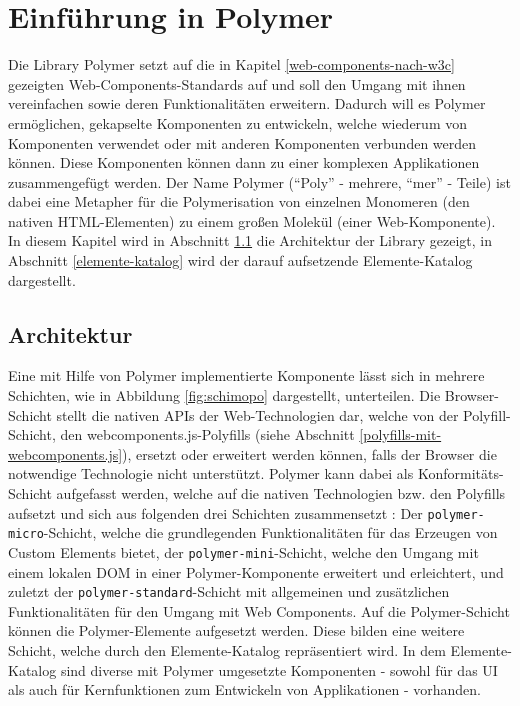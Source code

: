 \chapter{Einführung in Polymer}\label{einfuehrung-in-polymer}

Die Library Polymer setzt auf die in Kapitel \ref{web-components-nach-w3c} gezeigten Web-Components-Standards auf und soll den Umgang mit ihnen vereinfachen sowie deren Funktionalitäten erweitern. Dadurch will es Polymer ermöglichen, gekapselte Komponenten zu entwickeln, welche wiederum von Komponenten verwendet oder mit anderen Komponenten verbunden werden können. Diese Komponenten können dann zu einer komplexen Applikationen zusammengefügt werden. Der Name Polymer (``Poly'' - mehrere, ``mer'' - Teile) ist dabei eine Metapher für die Polymerisation von einzelnen Monomeren (den nativen \ac{HTML}-Elementen) zu einem großen Molekül (einer Web-Komponente). In diesem Kapitel wird in Abschnitt \ref{architektur} die Architektur der Library gezeigt, in Abschnitt \ref{elemente-katalog} wird der darauf aufsetzende Elemente-Katalog dargestellt.


\section{Architektur}\label{architektur}

Eine mit Hilfe von Polymer implementierte Komponente lässt sich in mehrere Schichten, wie in Abbildung \ref{fig:schimopo} dargestellt, unterteilen. Die Browser-Schicht stellt die nativen \ac{API}s der Web-Technologien dar, welche von der Polyfill-Schicht, den webcomponents.js-Polyfills (siehe Abschnitt \ref{polyfills-mit-webcomponents.js}), ersetzt oder erweitert werden können, falls der Browser die notwendige Technologie nicht unterstützt. Polymer kann dabei als Konformitäts-Schicht aufgefasst werden, welche auf die nativen Technologien bzw. den Polyfills aufsetzt und sich aus folgenden drei Schichten zusammensetzt \cite{citeulike:13915080}: Der \texttt{polymer-micro}-Schicht, welche die grundlegenden Funktionalitäten für das Erzeugen von Custom Elements bietet, der \texttt{polymer-mini}-Schicht, welche den Umgang mit einem lokalen \ac{DOM} in einer Polymer-Komponente erweitert und erleichtert, und zuletzt der \texttt{polymer-standard}-Schicht mit allgemeinen und zusätzlichen Funktionalitäten für den Umgang mit Web Components. Auf die Polymer-Schicht können die Polymer-Elemente aufgesetzt werden. Diese bilden eine weitere Schicht, welche durch den Elemente-Katalog \cite{citeulike:13916374} repräsentiert wird. In dem Elemente-Katalog sind diverse mit Polymer umgesetzte Komponenten - sowohl für das \ac{UI} als auch für Kernfunktionen zum Entwickeln von Applikationen - vorhanden.

